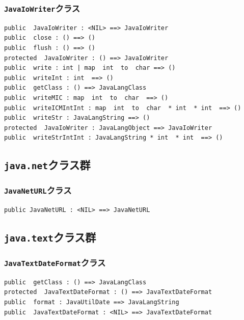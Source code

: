 \documentclass[\pformat,12pt]{jarticle}
\begin{document}
\subsubsection{\texttt{JavaIoWriter}クラス}
\begin{small}
\begin{verbatim}
public  JavaIoWriter : <NIL> ==> JavaIoWriter
public  close : () ==> ()
public  flush : () ==> ()
protected  JavaIoWriter : () ==> JavaIoWriter
public  write : int | map  int  to  char ==> ()
public  writeInt : int  ==> ()
public  getClass : () ==> JavaLangClass
public  writeMIC : map  int  to  char  ==> ()
public  writeICMIntInt : map  int  to  char  * int  * int  ==> ()
public  writeStr : JavaLangString ==> ()
protected  JavaIoWriter : JavaLangObject ==> JavaIoWriter
public  writeStrIntInt : JavaLangString * int  * int  ==> ()
\end{verbatim}
\end{small}

\subsection{\texttt{java.net}クラス群}

\subsubsection{\texttt{JavaNetURL}クラス}
\begin{small}
\begin{verbatim}
public JavaNetURL : <NIL> ==> JavaNetURL
\end{verbatim}
\end{small}

\subsection{\texttt{java.text}クラス群}

\subsubsection{\texttt{JavaTextDateFormat}クラス}
\begin{small}
\begin{verbatim}
public  getClass : () ==> JavaLangClass
protected  JavaTextDateFormat : () ==> JavaTextDateFormat
public  format : JavaUtilDate ==> JavaLangString
public  JavaTextDateFormat : <NIL> ==> JavaTextDateFormat
\end{verbatim}
\end{small}
\end{document}
